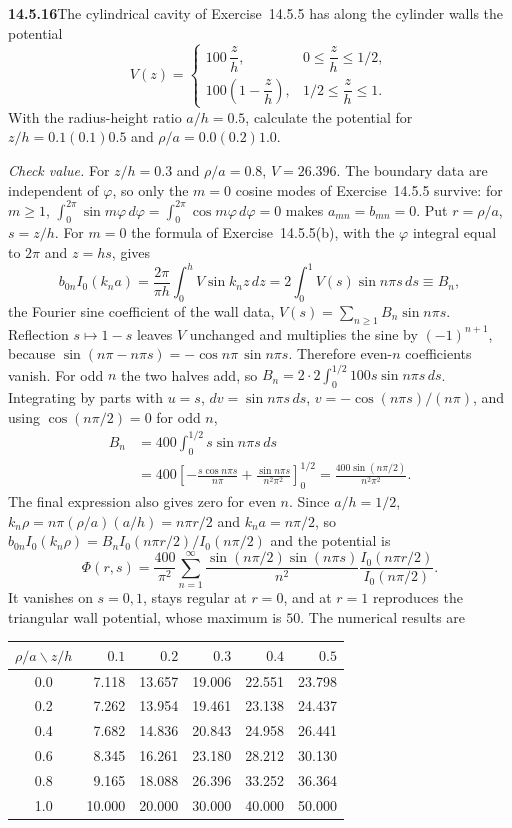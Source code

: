 \par\bigskip
\noindent\textbf{14.5.16}\quad The cylindrical cavity of
Exercise~14.5.5 has along the cylinder walls the potential
\[
V(z)=\begin{cases}
100\,\dfrac{z}{h}, & 0\le\dfrac{z}{h}\le1/2,\\[8pt]
100\left(1-\dfrac{z}{h}\right), & 1/2\le\dfrac{z}{h}\le1.
\end{cases}
\]
With the radius-height ratio $a/h=0.5$, calculate the potential for
$z/h=0.1(0.1)0.5$ and $\rho/a=0.0(0.2)1.0$.
\par\nobreak\hfill\emph{Check value.}\enspace
For $z/h=0.3$ and $\rho/a=0.8$, $V=26.396$.
\solution
The boundary data are independent of $\varphi$, so only the
$m=0$ cosine modes of Exercise~14.5.5 survive: for $m\ge1$,
$\int_0^{2\pi}\sin m\varphi\,d\varphi=\int_0^{2\pi}\cos m\varphi\,
d\varphi=0$ makes $a_{mn}=b_{mn}=0$. Put $r=\rho/a$, $s=z/h$. For
$m=0$ the formula of Exercise~14.5.5(b), with the $\varphi$
integral equal to $2\pi$ and $z=hs$, gives
\[
b_{0n}I_0(k_na)=\frac{2\pi}{\pi h}\int_0^hV\sin k_nz\,dz
=2\int_0^1V(s)\sin n\pi s\,ds\equiv B_n,
\]
the Fourier sine coefficient of the wall data,
$V(s)=\sum_{n\ge1}B_n\sin n\pi s$.
Reflection $s\mapsto1-s$ leaves $V$ unchanged and multiplies the
sine by $(-1)^{n+1}$, because
$\sin(n\pi-n\pi s)=-\cos n\pi\,\sin n\pi s$. Therefore even-$n$
coefficients vanish. For odd $n$ the two halves add, so
$B_n=2\cdot2\int_0^{1/2}100s\sin n\pi s\,ds$. Integrating by parts
with $u=s$, $dv=\sin n\pi s\,ds$, $v=-\cos(n\pi s)/(n\pi)$, and
using $\cos(n\pi/2)=0$ for odd $n$,
\begin{align*}
B_n&=400\int_0^{1/2}s\sin n\pi s\,ds\\
&=400\left[-\frac{s\cos n\pi s}{n\pi}
+\frac{\sin n\pi s}{n^2\pi^2}\right]_0^{1/2}
=\frac{400\sin(n\pi/2)}{n^2\pi^2}.
\end{align*}
The final expression also gives zero for even $n$. Since $a/h=1/2$,
$k_n\rho=n\pi(\rho/a)(a/h)=n\pi r/2$ and $k_na=n\pi/2$, so
$b_{0n}I_0(k_n\rho)=B_nI_0(n\pi r/2)/I_0(n\pi/2)$ and the potential
is
\[
\boxed{\Phi(r,s)=\frac{400}{\pi^2}\sum_{n=1}^{\infty}
\frac{\sin(n\pi/2)\sin(n\pi s)}{n^2}
\frac{I_0(n\pi r/2)}{I_0(n\pi/2)}}.
\]
It vanishes on $s=0,1$, stays regular at $r=0$, and at $r=1$
reproduces the triangular wall potential, whose maximum is $50$.
The numerical results are
\begin{center}
\begin{tabular}{c r r r r r}
\toprule
$\rho/a\backslash z/h$ & $0.1$ & $0.2$ & $0.3$ & $0.4$ & $0.5$\\
\midrule
0.0 & 7.118 & 13.657 & 19.006 & 22.551 & 23.798 \\
0.2 & 7.262 & 13.954 & 19.461 & 23.138 & 24.437 \\
0.4 & 7.682 & 14.836 & 20.843 & 24.958 & 26.441 \\
0.6 & 8.345 & 16.261 & 23.180 & 28.212 & 30.130 \\
0.8 & 9.165 & 18.088 & 26.396 & 33.252 & 36.364 \\
1.0 & 10.000 & 20.000 & 30.000 & 40.000 & 50.000 \\
\bottomrule
\end{tabular}
\end{center}
